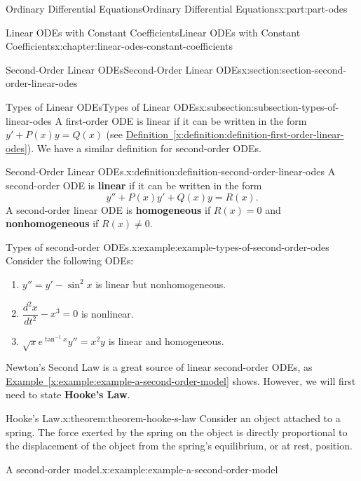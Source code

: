 \documentclass[oneside,10pt,]{book}
\newcommand{\xreffont}{\relax}
\newcommand{\terminology}[1]{\textbf{#1}}
\numberwithin{equation}{part}
\newcommand{\dv}[3][]{\dfrac{d^{#1} #2}{d #3^{#1}}}
\begin{document}
\begin{partptx}{Ordinary Differential Equations}{}{Ordinary Differential Equations}{}{}{x:part:part-odes}
\begin{chapterptx}{Linear ODEs with Constant Coefficients}{}{Linear ODEs with Constant Coefficients}{}{}{x:chapter:linear-odes-constant-coefficients}
\begin{sectionptx}{Second-Order Linear ODEs}{}{Second-Order Linear ODEs}{}{}{x:section:section-second-order-linear-odes}
\begin{introduction}{}
\end{introduction}%
%
%
\typeout{************************************************}
\typeout{************************************************}
%
\begin{subsectionptx}{Types of Linear ODEs}{}{Types of Linear ODEs}{}{}{x:subsection:subsection-types-of-linear-odes}
A first-order ODE is linear if it can be written in the form \(y'+P(x)y = Q(x)\) (see \hyperref[x:definition:definition-first-order-linear-odes]{Definition~{\xreffont\ref{x:definition:definition-first-order-linear-odes}}}). We have a similar definition for second-order ODEs.%
\begin{definition}{Second-Order Linear ODEs.}{x:definition:definition-second-order-linear-odes}%
%
A second-order ODE is \terminology{linear} if it can be written in the form%
\begin{equation*}
y''+P(x)y'+Q(x)y = R(x).
\end{equation*}
A second-order linear ODE is \terminology{homogeneous} if \(R(x) = 0\) and \terminology{nonhomogeneous} if \(R(x)\neq0\).%
\end{definition}
\begin{example}{Types of second-order ODEs.}{x:example:example-types-of-second-order-odes}%
Consider the following ODEs:%
\begin{enumerate}
\item{}\(y'' = y' - \sin^{2}x\) is linear but nonhomogeneous.%
\item{}\(\dv[2]{x}{t} - x^{3} = 0\) is nonlinear.%
\item{}\(\sqrt{x}e^{\tan^{-1}x}y'' = x^{2}y\) is linear and homogeneous.%
\end{enumerate}
%
\end{example}
Newton's Second Law is a great source of linear second-order ODEs, as \hyperref[x:example:example-a-second-order-model]{Example~{\xreffont\ref{x:example:example-a-second-order-model}}} shows. However, we will first need to state \terminology{Hooke's Law}.%
\begin{theorem}{Hooke's Law.}{}{x:theorem:theorem-hooke-s-law}%
%
Consider an object attached to a spring. The force exerted by the spring on the object is directly proportional to the displacement of the object from the spring's equilibrium, or at rest, position.%
\end{theorem}
\begin{example}{A second-order model.}{x:example:example-a-second-order-model}%

\end{example}
\end{subsectionptx}
\end{sectionptx}
\end{chapterptx}
\end{partptx}
\end{document}
